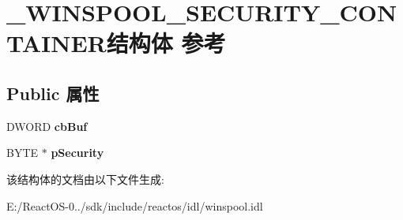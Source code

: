 \hypertarget{struct___w_i_n_s_p_o_o_l___s_e_c_u_r_i_t_y___c_o_n_t_a_i_n_e_r}{}\section{\+\_\+\+W\+I\+N\+S\+P\+O\+O\+L\+\_\+\+S\+E\+C\+U\+R\+I\+T\+Y\+\_\+\+C\+O\+N\+T\+A\+I\+N\+E\+R结构体 参考}
\label{struct___w_i_n_s_p_o_o_l___s_e_c_u_r_i_t_y___c_o_n_t_a_i_n_e_r}
\subsection*{Public 属性}
\begin{DoxyCompactItemize}
\item 
\mbox{\label{struct___w_i_n_s_p_o_o_l___s_e_c_u_r_i_t_y___c_o_n_t_a_i_n_e_r_aee14d3b369b97d619a3a96b10110df75}} 
D\+W\+O\+RD {\bfseries cb\+Buf}
\item 
\mbox{\label{struct___w_i_n_s_p_o_o_l___s_e_c_u_r_i_t_y___c_o_n_t_a_i_n_e_r_add6d4be7556576529cadebb3ee47e76c}} 
B\+Y\+TE $\ast$ {\bfseries p\+Security}
\end{DoxyCompactItemize}


该结构体的文档由以下文件生成\+:\begin{DoxyCompactItemize}
\item 
E\+:/\+React\+O\+S-\/0../sdk/include/reactos/idl/winspool.\+idl\end{DoxyCompactItemize}
